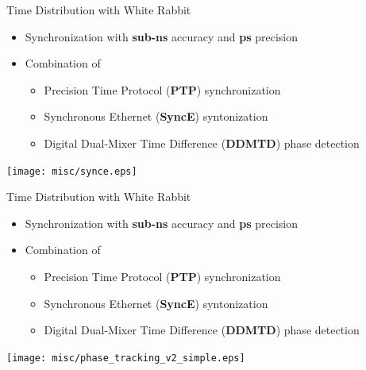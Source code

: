 \documentclass[compress,red]{beamer}
\begin{document}
\begin{frame}{Time Distribution with White Rabbit}

\begin{center}
  \begin{itemize}
    \item Synchronization with {\bf sub-ns} accuracy and {\bf ps} precision
    \item Combination of
	\begin{itemize}\small
	  \item Precision Time Protocol ({\bf PTP}) synchronization
	  \item Synchronous Ethernet ({\bf SyncE}) syntonization
	  \item Digital Dual-Mixer Time Difference ({\bf DDMTD}) phase detection
	\end{itemize}
  \end{itemize}
	\texttt{[image: misc/synce.eps]}
\end{center}
\end{frame}

\begin{frame}{Time Distribution with White Rabbit}

\begin{center}
  \begin{itemize}
    \item Synchronization with {\bf sub-ns} accuracy and {\bf ps} precision
    \item Combination of
	\begin{itemize}\small
	  \item Precision Time Protocol ({\bf PTP}) synchronization
	  \item Synchronous Ethernet ({\bf SyncE}) syntonization
	  \item Digital Dual-Mixer Time Difference ({\bf DDMTD}) phase detection
	\end{itemize}
  \end{itemize}
	\texttt{[image: misc/phase\_tracking\_v2\_simple.eps]}
\end{center}  
\end{frame}
\end{document}
